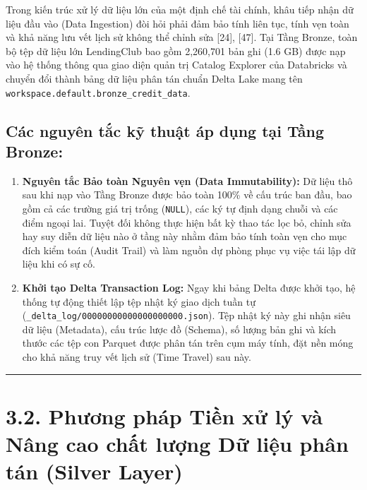 \documentclass[
  13pt,
  a4paper,
]{report}
\providecommand{\tightlist}{%
  \setlength{\itemsep}{0pt}\setlength{\parskip}{0pt}}
\begin{document}
Trong kiến trúc xử lý dữ liệu lớn của một định chế tài chính, khâu tiếp
nhận dữ liệu đầu vào (Data Ingestion) đòi hỏi phải đảm bảo tính liên
tục, tính vẹn toàn và khả năng lưu vết lịch sử không thể chỉnh sửa
{[}24{]}, {[}47{]}. Tại Tầng Bronze, toàn bộ tệp dữ liệu lớn LendingClub
bao gồm 2,260,701 bản ghi (1.6 GB) được nạp vào hệ thống thông qua giao
diện quản trị Catalog Explorer của Databricks và chuyển đổi thành bảng
dữ liệu phân tán chuẩn Delta Lake mang tên
\texttt{workspace.default.bronze\_credit\_data}.

\subsection{Các nguyên tắc kỹ thuật áp dụng tại Tầng
Bronze:}\label{cuxe1c-nguyuxean-tux1eafc-kux1ef9-thuux1eadt-uxe1p-dux1ee5ng-tux1ea1i-tux1ea7ng-bronze}

\begin{enumerate}
\def\labelenumi{\arabic{enumi}.}
\tightlist
\item
  \textbf{Nguyên tắc Bảo toàn Nguyên vẹn (Data Immutability):} Dữ liệu
  thô sau khi nạp vào Tầng Bronze được bảo toàn 100\% về cấu trúc ban
  đầu, bao gồm cả các trường giá trị trống (\texttt{NULL}), các ký tự
  định dạng chuỗi và các điểm ngoại lai. Tuyệt đối không thực hiện bất
  kỳ thao tác lọc bỏ, chỉnh sửa hay suy diễn dữ liệu nào ở tầng này nhằm
  đảm bảo tính toàn vẹn cho mục đích kiểm toán (Audit Trail) và làm
  nguồn dự phòng phục vụ việc tái lập dữ liệu khi có sự cố.
\item
  \textbf{Khởi tạo Delta Transaction Log:} Ngay khi bảng Delta được khởi
  tạo, hệ thống tự động thiết lập tệp nhật ký giao dịch tuần tự
  (\texttt{\_delta\_log/00000000000000000000.json}). Tệp nhật ký này ghi
  nhận siêu dữ liệu (Metadata), cấu trúc lược đồ (Schema), số lượng bản
  ghi và kích thước các tệp con Parquet được phân tán trên cụm máy tính,
  đặt nền móng cho khả năng truy vết lịch sử (Time Travel) sau này.
\end{enumerate}

\begin{center}\rule{0.5\linewidth}{0.5pt}\end{center}

\section{3.2. Phương pháp Tiền xử lý và Nâng cao chất lượng Dữ liệu phân
tán (Silver
Layer)}\label{phux1b0ux1a1ng-phuxe1p-tiux1ec1n-xux1eed-luxfd-vuxe0-nuxe2ng-cao-chux1ea5t-lux1b0ux1ee3ng-dux1eef-liux1ec7u-phuxe2n-tuxe1n-silver-layer}
\end{document}
